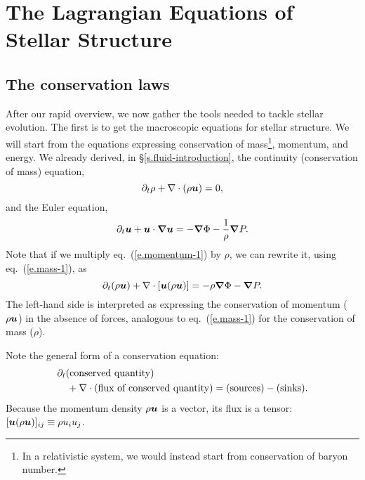 \chapter[Stellar Structure Equations]{The Lagrangian Equations of Stellar Structure}

\section{The conservation laws}

After our rapid overview, we now gather the tools needed to tackle stellar evolution.  The first is to get the macroscopic equations for stellar structure. We will start from the equations expressing conservation of mass\footnote{In a relativistic system, we would instead start from conservation of baryon number.}, momentum, and energy. We already derived, in \S\ref{s.fluid-introduction}, the continuity (conservation of mass) equation,
\begin{equation}\label{e.mass-1}
\partial_{t}\rho + \nabla \cdot(\rho\boldsymbol{u}) = 0,
\end{equation}
and the Euler equation,
\begin{equation}\label{e.momentum-1}
\partial_{t}\boldsymbol{u} + \boldsymbol{u}\cdot\boldsymbol{\nabla}\boldsymbol{u} = -\boldsymbol{\nabla} \Phi - \frac{1}{\rho}\boldsymbol{\nabla} P.
\end{equation}
Note that if we multiply eq.~(\ref{e.momentum-1}) by $\rho$, we can rewrite it, using eq.~(\ref{e.mass-1}), as
\begin{equation}\label{e.momentum-2}
	\partial_{t}(\rho\boldsymbol{u}) + \nabla \cdot[\boldsymbol{u}(\rho\boldsymbol{u})] = -\rho\boldsymbol{\nabla}\Phi -\boldsymbol{\nabla} P.
\end{equation}
The left-hand side is interpreted as expressing the conservation of momentum ($\rho\boldsymbol{u}$) in the absence of forces, analogous to eq.~(\ref{e.mass-1}) for the conservation of mass ($\rho$).

Note the general form of a conservation equation:
\begin{eqnarray*}
\lefteqn{\partial_{t}(\textrm{conserved quantity})}\\
 & & \mbox{} + \divr(\textrm{flux of conserved quantity}) =
 (\textrm{sources}) - (\textrm{sinks}).
\end{eqnarray*}
Because the momentum density $\rho\boldsymbol{u}$ is a vector, its flux is a tensor: $[\boldsymbol{u}(\rho\boldsymbol{u})]_{ij} \equiv \rho u_{i}u_{j}$.


